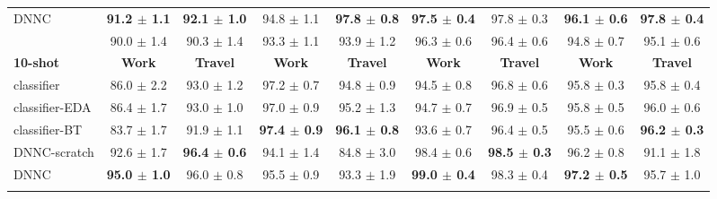 \begin{table}[h]
{\begin{tabular}{lcccccccc}
\multicolumn{1}{l|}{DNNC}    & \textbf{91.2 $\pm$ 1.1} & \multicolumn{1}{c|}{\textbf{92.1 $\pm$ 1.0}} & 94.8 $\pm$ 1.1          & \multicolumn{1}{c|}{\textbf{97.8 $\pm$ 0.8}} & \textbf{97.5 $\pm$ 0.4} & \multicolumn{1}{c|}{97.8 $\pm$ 0.3}          & \textbf{96.1 $\pm$ 0.6} & \textbf{97.8 $\pm$ 0.4} \\ \hdashline
\multicolumn{1}{l|}{classifier (50-shot)}       &   90.0 $\pm$ 1.4       & \multicolumn{1}{c|}{90.3 $\pm$ 1.4}          &     93.3 $\pm$ 1.1     & \multicolumn{1}{c|}{93.9 $\pm$ 1.2}          &     96.3 $\pm$ 0.6     & \multicolumn{1}{c|}{96.4 $\pm$ 0.6}          &    94.8  $\pm$ 0.7     &  95.1 $\pm$ 0.6        \\ \hline
\multicolumn{1}{l|}{\textbf{10-shot}} & \textbf{Work}                        & \multicolumn{1}{c|}{\textbf{Travel}}                      & \textbf{Work}                        & \multicolumn{1}{c|}{\textbf{Travel}}                      & \textbf{Work}                        & \multicolumn{1}{c|}{\textbf{Travel}}                      & \textbf{Work}                        & \textbf{Travel}                      \\ \hline
\multicolumn{1}{l|}{classifier}       & 86.0 $\pm$ 2.2          & \multicolumn{1}{c|}{93.0 $\pm$ 1.2}          & 97.2 $\pm$ 0.7          & \multicolumn{1}{c|}{94.8 $\pm$ 0.9}          & 94.5 $\pm$ 0.8          & \multicolumn{1}{c|}{96.8 $\pm$ 0.6}          & 95.8 $\pm$ 0.3          & 95.8 $\pm$ 0.4          \\
\multicolumn{1}{l|}{classifier-EDA}   & 86.4 $\pm$ 1.7          & \multicolumn{1}{c|}{93.0 $\pm$ 1.0}          & 97.0 $\pm$ 0.9          & \multicolumn{1}{c|}{95.2 $\pm$ 1.3}          & 94.7 $\pm$ 0.7          & \multicolumn{1}{c|}{96.9 $\pm$ 0.5}          & 95.8 $\pm$ 0.5          & 96.0 $\pm$ 0.6          \\
\multicolumn{1}{l|}{classifier-BT}    & 83.7 $\pm$ 1.7          & \multicolumn{1}{c|}{91.9 $\pm$ 1.1}          & \textbf{97.4 $\pm$ 0.9} & \multicolumn{1}{c|}{\textbf{96.1 $\pm$ 0.8}} & 93.6 $\pm$ 0.7          & \multicolumn{1}{c|}{96.4 $\pm$ 0.5}          & 95.5 $\pm$ 0.6          & \textbf{96.2 $\pm$ 0.3} \\
\multicolumn{1}{l|}{DNNC-scratch}      & 92.6 $\pm$ 1.7          & \multicolumn{1}{c|}{\textbf{96.4 $\pm$ 0.6}} & 94.1 $\pm$ 1.4          & \multicolumn{1}{c|}{84.8 $\pm$ 3.0}          & 98.4 $\pm$ 0.6          & \multicolumn{1}{c|}{\textbf{98.5 $\pm$ 0.3}} & 96.2 $\pm$ 0.8          & 91.1 $\pm$ 1.8          \\
\multicolumn{1}{l|}{DNNC}    & \textbf{95.0 $\pm$ 1.0} & \multicolumn{1}{c|}{96.0 $\pm$ 0.8}          & 95.5 $\pm$ 0.9          & \multicolumn{1}{c|}{93.3 $\pm$ 1.9}          & \textbf{99.0 $\pm$ 0.4} & \multicolumn{1}{c|}{98.3 $\pm$ 0.4}          & \textbf{97.2 $\pm$ 0.5} & 95.7 $\pm$ 1.0          \\ \hdashline

\end{tabular}}
\end{table}
